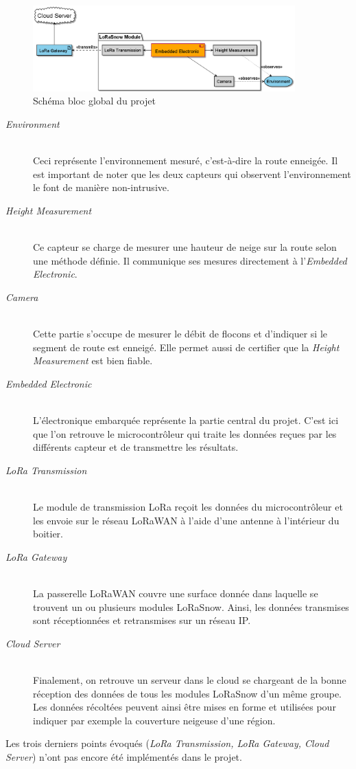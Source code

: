 \begin{figure}[H]
    \centering
    \includegraphics[width=0.9\textwidth]{Diagram/out/BlockDiagram/GlobalBlockDiagram.png}
    \caption{Schéma bloc global du projet}
    \label{fig:GlobalBlockDiagram}
\end{figure}

\begin{description}
    \item[\emph{Environment}] \hfill \\ 
    Ceci représente l'environnement mesuré, c'est-à-dire la route enneigée. Il est important de noter
    que les deux capteurs qui observent l'environnement le font de manière non-intrusive.
    \item[\emph{Height Measurement}] \hfill \\
    Ce capteur se charge de mesurer une hauteur de neige sur la route selon une méthode définie. Il 
    communique ses mesures directement à l'\emph{Embedded Electronic}. 
    \item[\emph{Camera}] \hfill \\
    Cette partie s'occupe de mesurer le débit de flocons et d'indiquer si le segment de route est enneigé.
    Elle permet aussi de certifier que la \emph{Height Measurement} est bien fiable.
    \item[\emph{Embedded Electronic}] \hfill \\
    L'électronique embarquée représente la partie central du projet. C'est ici que l'on retrouve le
    microcontrôleur qui traite les données reçues par les différents capteur et de transmettre les
    résultats. 
    \item[\emph{LoRa Transmission}] \hfill \\
     Le module de transmission LoRa reçoit les données du microcontrôleur et les envoie sur le réseau 
     LoRaWAN à l'aide d'une antenne à l'intérieur du boitier.
    \item[\emph{LoRa Gateway}] \hfill \\
    La passerelle LoRaWAN couvre une surface donnée dans laquelle se trouvent un ou plusieurs modules 
    LoRaSnow. Ainsi, les données transmises sont réceptionnées et retransmises sur un réseau IP. 
    \item[\emph{Cloud Server}] \hfill \\   
    Finalement, on retrouve un serveur dans le cloud se chargeant de la bonne réception des données 
    de tous les modules LoRaSnow d'un même groupe. Les données récoltées peuvent ainsi être mises en
    forme et utilisées pour indiquer par exemple la couverture neigeuse d'une région.
\end{description}

Les trois derniers points évoqués (\emph{LoRa Transmission, LoRa Gateway, Cloud Server}) 
n'ont pas encore été implémentés dans le projet.